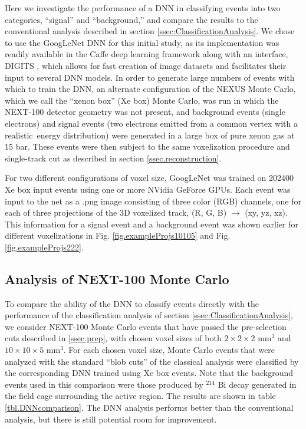 \documentclass[a4paper,11pt]{article}
\begin{document}
Here we investigate the performance of a DNN in classifying events into two categories, ``signal'' and ``background,'' and compare the results to the conventional analysis described in
section \ref{ssec:ClassificationAnalysis}.  We chose to use the GoogLeNet DNN for this initial study, as its implementation was readily available in the Caffe \cite{jia2014caffe}
deep learning framework along with an interface, DIGITS \cite{DIGITS}, which allows for fast creation of image datasets and facilitates their input to several DNN models.  
In order to generate large numbers of events with which to train the DNN, an alternate configuration of the NEXUS Monte Carlo, which we call the ``xenon box'' (Xe box) Monte Carlo, 
was run in which the NEXT-100 detector geometry was not present, and background events (single electrons) and signal events (two electrons emitted from a common vertex with a realistic 
\bbonu\,energy distribution) were generated in a large box of pure xenon gas at 15 bar.  These events were then subject to the same voxelization procedure and single-track cut as described in 
section \ref{ssec.reconstruction}.  

For two different configurations of voxel size, GoogLeNet was trained on 202400 Xe box input events using one or more NVidia GeForce GPUs.  Each event was input to the net as a .png image 
consisting of three color (RGB) channels, one for each of three projections of the 3D voxelized track, (R, G, B) $\rightarrow$ (xy, yz, xz).  This information for a signal event and a background event
was shown earlier for different voxelizations in Fig. \ref{fig.exampleProjs10105} and Fig. \ref{fig.exampleProjs222}.

\subsection{Analysis of NEXT-100 Monte Carlo}\label{ssec:NEXTMCanalysis}
To compare the ability of the DNN to classify events directly with the performance of the classification analysis of section \ref{ssec:ClassificationAnalysis}, we consider NEXT-100 Monte Carlo 
events that have passed the pre-selection cuts described in \ref{ssec.prep}, with chosen voxel sizes of both $2 \times 2 \times 2$ mm$^3$ and $10 \times 10 \times 5$ mm$^3$.  For each chosen voxel size,
Monte Carlo events that were analyzed with the standard ``blob cuts'' of the classical analysis were classified by the corresponding DNN trained using Xe box events.  Note that the background events
used in this comparison were those produced by $^{214}$ Bi decay generated in the field cage surrounding the active region.   The results are shown in table 
\ref{tbl.DNNcomparison}.  The DNN analysis performs better than the conventional analysis, but there is still potential room for improvement.
\end{document}
